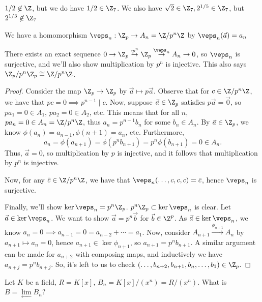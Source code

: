 \begin{ex}
    $1/2 \not \in \Z$, but we do have $1/2 \in \Z_7$. We also have $\sqrt 2 \in \Z_7,2^{1/5}\in \Z_7$, but $2^{1/3}\not \in \Z_7$
\end{ex}

\begin{defn}
    We have a homomorphism $\veps_n :\Z_p \to A_n=\Z /p^n\Z$ by $\veps_n(\vec a)= a_n$
\end{defn}

\begin{thm}[][label=thm:zp-exact]
    There exists an exact sequence $0 \to \Z_p \overset{\cdot p^n}{\to} \Z_p \overset{\veps_n}{\to}A_n\to0$, so $\veps_n$ is surjective, and we'll also show multiplication by $p^n$ is injective. This also says $\Z_p/p^n\Z_p \cong \Z / p^n\Z$.
\end{thm}

\begin{proof}
    Consider the map $\Z_p \to \Z_p$ by $\vec a \mapsto p\vec a$. Observe that for $c \in \Z/p^n\Z$, we have that $pc=0 \implies p^{n-1} \mid c$. Now, suppose $\vec a \in \Z_p$ satisfies $p\vec a = \vec 0$, so $pa_1=0 \in A_1$, $pa_2=0\in A_2$, etc. This means that for all $n$, $pa_n = 0 \in A_n=\Z/p^n\Z$, thus $a_n=p^{n-1}b_n$ for some $b_n \in A_n$. By $\vec a \in \Z_p$, we know $\phi(a_n)=a_{n-1},\phi(n+1)=a_n$, etc. Furthermore,
    $$a_{n}=\phi(a_{n+1})=\phi(p^{n}b_{n+1})=p^{n}\phi(b_{n+1})=0\in A_{n}.$$
    Thus, $\vec a =0$, so multiplication by $p$ is injective, and it follows that multiplication by $p^n$ is injective.

    Now, for any $\bar c \in \Z/p^n\Z$, we have that $\veps _n(\dots,c,c,c)=\bar c$, hence $\veps _n$ is surjective.

    Finally, we'll show $\ker \veps _n = p^n \Z _p$. $p^n \Z_p \subset \ker \veps _n$ is clear. Let $\vec a \in \ker \veps _n$. We want to show $\vec a = p^n\vec b$ for $\vec b \in \Z^p$. As $\vec a \in \ker \veps_n$, we know $a_n=0\implies a_{n-1}=0=a_{n-2}+\cdots=a_1$. Now, consider $A_{n+1} \overset{\phi _{n+1}}{\to} A_n$ by $a_{n+1}\mapsto a_n=0$, hence $a_{n+1} \in \ker \phi_{n+1}$, so $a_{n+1}=p^nb_{n+1}$. A similar argument can be made for $a_{n+2}$ with composing maps, and inductively we have $a_{n+j}=p^nb_{n+j}$. So, it's left to us to check $(\dots,b_{n+2},b_{n+1},b_n,\dots,b_1)\in \Z_p$.
\end{proof}

\begin{ex}
    Let $K$ be a field, $R=K[x]$, $B_n=K[x]/(x^n)=R/(x^n)$. What is $B= \underset{\leftarrow}{\lim}B_n$?
\end{ex}

